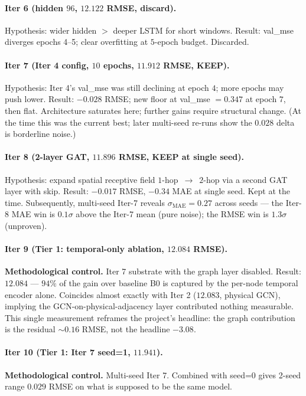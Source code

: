 \documentclass{article}
\begin{document}
\paragraph{Iter 6 (hidden $96$, $12.122$ RMSE, discard).}
Hypothesis: wider hidden $>$ deeper LSTM for short windows. Result: val\_mse diverges epochs 4--5; clear overfitting at $5$-epoch budget. Discarded.

\paragraph{Iter 7 (Iter 4 config, $10$ epochs, $11.912$ RMSE, KEEP).}
Hypothesis: Iter 4's val\_mse was still declining at epoch $4$; more epochs may push lower. Result: $-0.028$ RMSE; new floor at val\_mse $= 0.347$ at epoch $7$, then flat. Architecture saturates here; further gains require structural change. (At the time this was the current best; later multi-seed re-runs show the $0.028$ delta is borderline noise.)

\paragraph{Iter 8 (2-layer GAT, $11.896$ RMSE, KEEP at single seed).}
Hypothesis: expand spatial receptive field $1$-hop~$\to$~$2$-hop via a second GAT layer with skip. Result: $-0.017$ RMSE, $-0.34$ MAE at single seed. Kept at the time. Subsequently, multi-seed Iter-7 reveals $\sigma_{\mathrm{MAE}} = 0.27$ across seeds --- the Iter-8 MAE win is $0.1\sigma$ above the Iter-7 mean (pure noise); the RMSE win is $1.3\sigma$ (unproven).

\paragraph{Iter 9 (Tier 1: temporal-only ablation, $12.084$ RMSE).}
\textbf{Methodological control.} Iter 7 substrate with the graph layer disabled. Result: $12.084$ --- $94\%$ of the gain over baseline B0 is captured by the per-node temporal encoder alone. Coincides almost exactly with Iter 2 ($12.083$, physical GCN), implying the GCN-on-physical-adjacency layer contributed nothing measurable. This single measurement reframes the project's headline: the graph contribution is the residual $\sim 0.16$ RMSE, not the headline $-3.08$.

\paragraph{Iter 10 (Tier 1: Iter 7 seed=1, $11.941$).}
\textbf{Methodological control.} Multi-seed Iter 7. Combined with seed=0 gives 2-seed range $0.029$ RMSE on what is supposed to be the same model.
\end{document}
